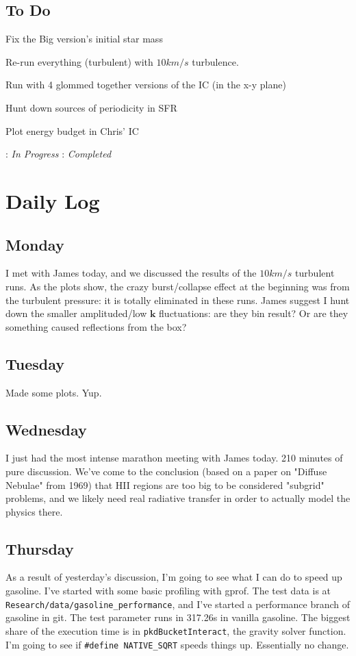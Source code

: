 \documentclass[11pt,letterpaper]{article}
\begin{document}
\subsection*{To Do}
\begin{bullets}
\item \checkmark Fix the Big version's initial star mass
\item \checkmark Re-run everything (turbulent) with $10km/s$ turbulence.
\item \textleaf Run with 4 glommed together versions of the IC (in the x-y plane)
\item Hunt down sources of periodicity in SFR
\item \checkmark Plot energy budget in Chris' IC
\end{bullets}

\textleaf : \textit{In Progress} \qquad \checkmark : \textit{Completed}

\section*{Daily Log}
\subsection*{Monday}
I met with James today, and we discussed the results of the $10 km/s$ turbulent
runs.  As the plots show, the crazy burst/collapse effect at the beginning was
from the turbulent pressure: it is totally eliminated in these runs.  James
suggest I hunt down the smaller amplituded/low $\mathbf{k}$ fluctuations:
are they bin result? Or are they something caused reflections from the box?
\subsection*{Tuesday}
Made some plots. Yup.
\subsection*{Wednesday}
I just had the most intense marathon meeting with James today.  210 minutes of
pure discussion.  We've come to the conclusion (based on a paper on "Diffuse 
Nebulae" from 1969) that HII regions are too big to be considered "subgrid"
problems, and we likely need real radiative transfer in order to actually 
model the physics there.

\subsection*{Thursday}
As a result of yesterday's discussion, I'm going to see what I can do to 
speed up gasoline.  I've started with some basic profiling with gprof. 
The test data is at \verb!Research/data/gasoline_performance!, and I've started
a performance branch of gasoline in git.  The test parameter runs in 317.26s
in vanilla gasoline.  The biggest share of the execution time is in 
\verb!pkdBucketInteract!, the gravity solver function. I'm going to see if 
\verb!#define NATIVE_SQRT! speeds things up.  Essentially no change.
\end{document}
